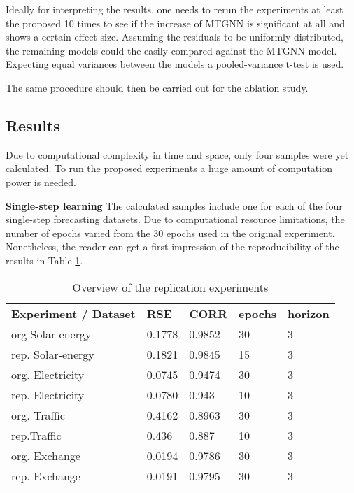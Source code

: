 \documentclass[letterpaper,twocolumn,11pt]{article}
\begin{document}
    Ideally for interpreting the results, one needs to rerun the experiments at least the proposed 10 times to see if the increase of MTGNN is significant at all and shows a certain effect size.
    Assuming the residuals to be uniformly distributed, the remaining models could the easily compared against the MTGNN model. Expecting equal variances between the models a pooled-variance t-test is used.

    The same procedure should then be carried out for the ablation study.

    \subsection{Results}
    Due to computational complexity in time and space, only four samples were yet calculated.
    To run the proposed experiments a huge amount of computation power is needed.

    \textbf{Single-step learning} The calculated samples include one for each of the four single-step forecasting datasets.
    Due to computational resource limitations, the number of epochs varied from the 30 epochs used in the original experiment.
    Nonetheless, the reader can get a first impression of the reproducibility of the results in Table \ref{tab:table}.

   \begin{table}
       \centering
       \caption{Overview of the replication experiments}
       \scriptsize
       \begin{tabular}{lllll}
           \hline
           \textbf{Experiment / Dataset} & \textbf{RSE} & \textbf{CORR} & \textbf{epochs} & \textbf{horizon} \\
           \hhline{=====}
           org Solar-energy~             & 0.1778       & 0.9852        & 30              & 3                \\
           rep. Solar-energy             & 0.1821       & 0.9845        & 15              & 3                \\
           \hhline{-----}
           org. Electricity              & 0.0745       & 0.9474        & 30              & 3                \\
           rep. Electricity              & 0.0780       & 0.943         & 10               & 3                \\
           \hhline{-----}
           org. Traffic                  & 0.4162       & 0.8963        & 30              & 3                \\
           rep.Traffic                   &   0.436        &  0.887       & 10               & 3                \\
           \hhline{-----}
           org. Exchange                 & 0.0194       & 0.9786        & 30              & 3                \\
           rep. Exchange                 & 0.0191       & 0.9795        & 30              & 3                \\
           \hline
       \end{tabular}\label{tab:table}
   \end{table}
\end{document}
